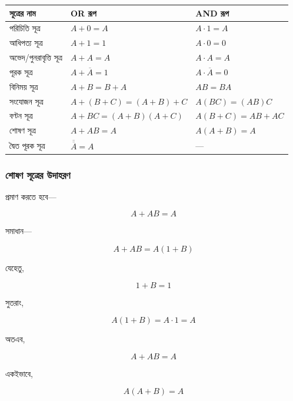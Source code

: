 \begin{center}
\small
\begin{tabularx}{\textwidth}{|L{0.27\textwidth}|Y|Y|}
\hline
{}
\textbf{সূত্রের নাম} &
\textbf{\textenglish{OR} রূপ} &
\textbf{\textenglish{AND} রূপ} \\
\hline

পরিচিতি সূত্র &
\(A+0=A\) &
\(A\cdot1=A\) \\
\hline

আধিপত্য সূত্র &
\(A+1=1\) &
\(A\cdot0=0\) \\
\hline

অভেদ/পুনরাবৃত্তি সূত্র &
\(A+A=A\) &
\(A\cdot A=A\) \\
\hline

পূরক সূত্র &
\(A+\overline{A}=1\) &
\(A\cdot\overline{A}=0\) \\
\hline

বিনিময় সূত্র &
\(A+B=B+A\) &
\(AB=BA\) \\
\hline

সংযোজন সূত্র &
\(A+(B+C)=(A+B)+C\) &
\(A(BC)=(AB)C\) \\
\hline

বণ্টন সূত্র &
\(A+BC=(A+B)(A+C)\) &
\(A(B+C)=AB+AC\) \\
\hline

শোষণ সূত্র &
\(A+AB=A\) &
\(A(A+B)=A\) \\
\hline

দ্বৈত পূরক সূত্র &
\(\overline{\overline{A}}=A\) &
--- \\
\hline
\end{tabularx}
\end{center}

\subsubsection*{শোষণ সূত্রের উদাহরণ}

প্রমাণ করতে হবে—

\[
A+AB=A
\]

সমাধান—

\[
A+AB=A(1+B)
\]

যেহেতু,

\[
1+B=1
\]

সুতরাং,

\[
A(1+B)=A\cdot1=A
\]

অতএব,

\[
\boxed{A+AB=A}
\]

একইভাবে,

\[
\boxed{A(A+B)=A}
\]

